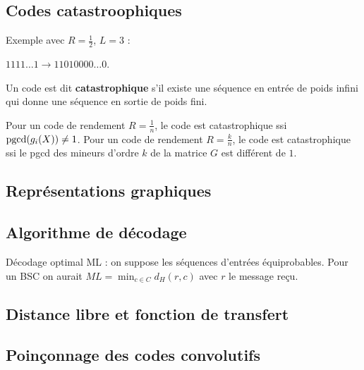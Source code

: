 \subsection{Codes catastroophiques}

	\begin{ex}
		Exemple avec $R = \frac{1}{2}$, $L = 3$ :
		
		
		$1111 \ldots 1 \longrightarrow 11010000 \ldots 0$.
	\end{ex}
	
	\begin{defn}
		Un code est dit \textbf{catastrophique} s'il existe une séquence en entrée de poids infini qui donne une séquence en sortie de poids fini.
	\end{defn}

	\begin{pop}
		Pour un code de rendement $R = \frac{1}{n}$, le code est catastrophique ssi $\operatorname{pgcd}(g_i(X)) \neq 1$.
		Pour un code de rendement $R = \frac{k}{n}$, le code est catastrophique ssi le pgcd des mineurs d'ordre $k$ de la matrice $G$ est différent de $1$.
	\end{pop}


\subsection{Représentations graphiques}

	

\subsection{Algorithme de décodage}

	Décodage optimal ML : on suppose les séquences d'entrées équiprobables.
	Pour un BSC on aurait $ML = \min_{c \in C} d_H(r,c)$ avec $r$ le message reçu.
	

\subsection{Distance libre et fonction de transfert}


\subsection{Poinçonnage des codes convolutifs}

